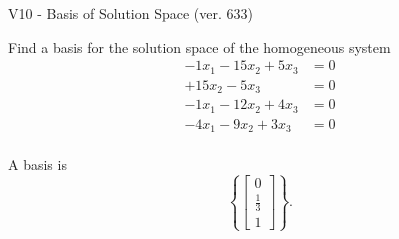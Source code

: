 \begin{exercise}
  \begin{exerciseTitle}V10 - Basis of Solution Space (ver. 633)\end{exerciseTitle}
  \begin{exerciseStatement}
    Find a basis for the solution space of the homogeneous system 
\begin{align*}
 -1 x_ 1 -15 x_ 2 + 5 x_ 3 &= 0  \\ 
  + 15 x_ 2 -5 x_ 3 &= 0  \\ 
  -1 x_ 1 -12 x_ 2 + 4 x_ 3 &= 0  \\ 
  -4 x_ 1 -9 x_ 2 + 3 x_ 3 &= 0  \\ 
 \end{align*}


 
  \end{exerciseStatement}

  \begin{exerciseAnswer}
   A basis is   
\[\left\{\left[\begin{array}{c}
0 \\
\frac{1}{3} \\
1
\end{array}\right]\right\}.\]

  


  \end{exerciseAnswer}
\end{exercise}
